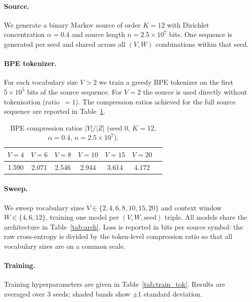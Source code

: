 \documentclass{article}
\theoremstyle{plain}
\theoremstyle{definition}
\theoremstyle{remark}
\begin{document}
\paragraph{Source.}
We generate a binary Markov source of order $K=12$ with Dirichlet
concentration $\alpha=0.4$ and source length $n=2.5\times10^7$ bits.
One sequence is generated per seed and shared across all $(V,W)$
combinations within that seed.

\paragraph{BPE tokenizer.}
For each vocabulary size $V>2$ we train a greedy BPE tokenizer on the
first $5\times10^5$ bits of the source sequence.
For $V=2$ the source is used directly without tokenisation (ratio~$=1$).
The compression ratios achieved for the full source sequence are reported
in Table~\ref{tab:ratios}.

\begin{table}[h]
\centering
\caption{BPE compression ratios $|Y|/|Z|$ (seed 0, $K=12$, $\alpha=0.4$,
$n=2.5\times10^7$).}
\label{tab:ratios}
\small
\begin{tabular}{ccccccc}
\toprule
$V=4$ & $V=6$ & $V=8$ & $V=10$ & $V=15$ & $V=20$ \\
\midrule
1.590 & 2.071 & 2.546 & 2.944 & 3.614 & 4.172 \\
\bottomrule
\end{tabular}
\end{table}

\paragraph{Sweep.}
We sweep vocabulary sizes $V \in \{2,4,6,8,10,15,20\}$ and context window
$W \in \{4,6,12\}$, training one model per $(V,W,\text{seed})$ triple.
All models share the architecture in Table~\ref{tab:arch}.
Loss is reported in bits per source symbol: the raw cross-entropy is
divided by the token-level compression ratio so that all vocabulary sizes
are on a common scale.

\paragraph{Training.}
Training hyperparameters are given in Table~\ref{tab:train_tok}.
Results are averaged over 3 seeds; shaded bands show $\pm 1$ standard
deviation.
\end{document}
